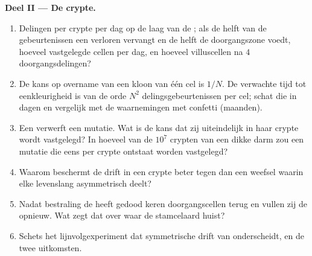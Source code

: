 \begin{problem}
\medskip
\noindent\textbf{Deel II --- De crypte.}
\begin{enumerate}[resume]
  \item Delingen per crypte per dag op de laag van de ; als
        de helft van de gebeurtenissen een verloren  vervangt en
        de helft de doorgangszone voedt, hoeveel vastgelegde cellen per
        dag, en hoeveel villuscellen na $4$ doorgangsdelingen?
  \item De kans op overname van een kloon van één cel is $1/N$. De
        verwachte tijd tot eenkleurigheid is van de orde $N^{2}$
        delingsgebeurtenissen per cel; schat die in dagen en vergelijk
        met de waarnemingen met confetti (maanden).
  \item Een  verwerft een mutatie. Wat is de kans dat zij
        uiteindelijk in haar crypte wordt vastgelegd? In hoeveel van de
        $10^{7}$ crypten van een dikke darm zou een mutatie die eens
        per crypte ontstaat worden vastgelegd?
  \item Waarom beschermt de drift in een crypte beter tegen  dan
        een weefsel waarin elke  levenslang asymmetrisch deelt?
  \item Nadat bestraling de  heeft gedood keren doorgangscellen
        terug en vullen zij de  opnieuw. Wat zegt dat over waar de
        stamcelaard huist?
  \item Schets het lijnvolgexperiment dat symmetrische drift van
         onderscheidt, en de twee uitkomsten.
\end{enumerate}


\end{problem}
